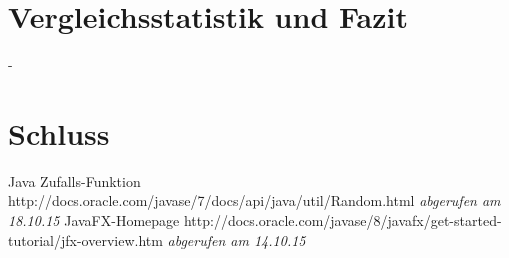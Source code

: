 \documentclass[12pt]{article}
\begin{document}
\section{Vergleichsstatistik und Fazit}
\newpage
-
\newpage

\section{Schluss}
\newpage

\begin{thebibliography}{9}
 Java Zufalls-Funktion http://docs.oracle.com/javase/7/docs/api/java/util/Random.html \emph{abgerufen am 18.10.15}
 JavaFX-Homepage http://docs.oracle.com/javase/8/javafx/get-started-tutorial/jfx-overview.htm \emph{abgerufen am 14.10.15}
\end{thebibliography}
\end{document}
